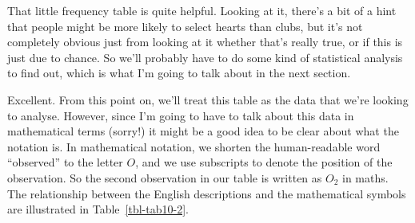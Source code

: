 \documentclass[
  a4paper,
]{book}
\begin{document}
That little frequency table is quite helpful. Looking at it, there's a
bit of a hint that people might be more likely to select hearts than
clubs, but it's not completely obvious just from looking at it whether
that's really true, or if this is just due to chance. So we'll probably
have to do some kind of statistical analysis to find out, which is what
I'm going to talk about in the next section.

Excellent. From this point on, we'll treat this table as the data that
we're looking to analyse. However, since I'm going to have to talk about
this data in mathematical terms (sorry!) it might be a good idea to be
clear about what the notation is. In mathematical notation, we shorten
the human-readable word ``observed'' to the letter \(O\), and we use
subscripts to denote the position of the observation. So the second
observation in our table is written as \(O_2\) in maths. The
relationship between the English descriptions and the mathematical
symbols are illustrated in Table~\ref{tbl-tab10-2}.

\hypertarget{tbl-tab10-2}{}
 
  \providecommand{\huxb}[2]{\arrayrulecolor[RGB]{#1}\global\arrayrulewidth=#2pt}
  \providecommand{\huxvb}[2]{\color[RGB]{#1}\vrule width #2pt}
  \providecommand{\huxtpad}[1]{\rule{0pt}{#1}}
  \providecommand{\huxbpad}[1]{\rule[-#1]{0pt}{#1}}
\end{document}
